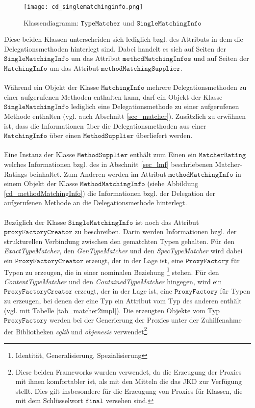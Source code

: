 \begin{figure}[h!]
\texttt{[image: cd\_singlematchinginfo.png]}
\caption{Klassendiagramm: $\texttt{TypeMatcher}$ und $\texttt{SingleMatchingInfo}$}
\label{fig_cdSingleMatchingInfo}
\end{figure}
\noindent
Diese beiden Klassen unterscheiden sich lediglich bzgl. des Attributs in dem die Delegationsmethoden hinterlegt sind. Dabei handelt es sich auf Seiten der $\texttt{SingleMatchingInfo}$ um das Attribut $\texttt{methodMatchingInfos}$ und auf Seiten der $\texttt{MatchingInfo}$ um das Attribut $\texttt{methodMatchingSupplier}$. 
\\\\
Während ein Objekt der Klasse $\texttt{MatchingInfo}$ mehrere Delegationsmethoden zu einer aufgerufenen Methoden enthalten kann, darf ein Objekt der Klasse $\texttt{SingleMatchingInfo}$ lediglich eine Delegationsmethode zu einer aufgerufenen Methode enthalten (vgl. auch Abschnitt \ref{sec_matcher}). Zusätzlich zu erwähnen ist, dass die Informationen über die Delegationsmethoden aus einer $\texttt{MatchingInfo}$ über einen $\texttt{MethodSupplier}$ überliefert werden.
\\\\
Eine Instanz der Klasse $\texttt{MethodSupplier}$ enthält zum Einen ein $\texttt{MatcherRating}$ welches Informationen bzgl. des in Abschnitt \ref{sec_lmf} beschriebenen Matcher-Ratings beinhaltet. Zum Anderen werden im Attribut $\texttt{methodMatchingInfo}$ in einem Objekt der Klasse $\texttt{MethodMatchingInfo}$ (siehe Abbildung \ref{cd_methodMatchingInfo}) die Informationen bzgl. der Delegation der aufgerufenen Methode an die Delegationsmethode hinterlegt. 
\\\\
Bezüglich der Klasse $\texttt{SingleMatchingInfo}$ ist noch das Attribut $\texttt{proxyFactoryCreator}$ zu beschreiben. Darin werden Informationen bzgl. der strukturellen Verbindung zwischen den gematchten Typen gehalten. Für den \emph{ExactTypeMatcher}, den \emph{GenTypeMatcher} und den \emph{SpecTypeMatcher} wird dabei ein $\texttt{ProxyFactoryCreator}$ erzeugt, der in der Lage ist, eine $\texttt{ProxyFactory}$ für Typen zu erzeugen, die in einer nominalen Beziehung \footnote{Identität, Generalisierung, Spezialisierung} stehen. Für den \emph{ContentTypeMatcher} und den \emph{ContainedTypeMatcher} hingegen, wird ein $\texttt{ProxyFactoryCreator}$ erzeugt, der in der Lage ist, eine $\texttt{ProxyFactory}$ für Typen zu erzeugen, bei denen der eine Typ ein Attribut vom Typ des anderen enthält (vgl. mit Tabelle \ref{tab_matcher2impl}). Die erzeugten Objekte vom Typ $\texttt{ProxyFactory}$ werden bei der Generierung der Proxies unter der Zuhilfenahme der Bibliotheken \emph{cglib} und \emph{objenesis} verwendet\footnote{Diese beiden Frameworks wurden verwendet, da die Erzeugung der Proxies mit ihnen komfortabler ist, als mit den Mitteln die das JKD zur Verfügung stellt. Dies gilt insbesondere für die Erzeugung von Proxies für Klassen, die mit dem Schlüsselwort $\texttt{final}$ versehen sind.}.
